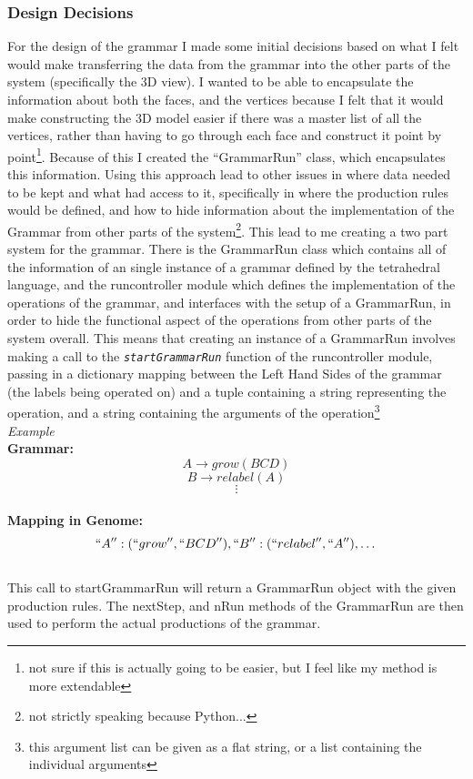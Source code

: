 \documentclass[letterpaper,oneside,titlepage]{article}
\begin{document}
\subsubsection{Design Decisions}
For the design of the grammar I made some initial decisions based on what I felt would make transferring the data from the grammar into the other parts of the system (specifically the 3D view).  I wanted to be able to encapsulate the information about both the faces, and the vertices because I felt that it would make constructing the 3D model easier if there was a master list of all the vertices, rather than having to go through each face and construct it point by point\footnote{not sure if this is actually going to be easier, but I feel like my method is more extendable}.  Because of this I created the ``GrammarRun'' class, which encapsulates this information.  Using this approach lead to other issues in where data needed to be kept and what had access to it, specifically in where the production rules would be defined, and how to hide information about the implementation of the Grammar from other parts of the system\footnote{not strictly speaking because Python...}.  This lead to me creating a two part system for the grammar.  There is the GrammarRun class which contains all of the information of an single instance of a grammar defined by the tetrahedral language, and the runcontroller module which defines the implementation of the operations of the grammar, and interfaces with the setup of a GrammarRun, in order to hide the functional aspect of the operations from other parts of the system overall.  This means that creating an instance of a GrammarRun involves making a call to the \emph{\texttt{startGrammarRun}} function of the runcontroller module, passing in a dictionary mapping between the Left Hand Sides of the grammar (the labels being operated on) and a tuple containing a string representing the operation, and a string containing the arguments of the operation\footnote{this argument list can be given as a flat string, or a list containing the individual arguments}
\\
\emph{Example}
\\
\textbf{Grammar:}
\\
\[A \to grow(BCD)\]
\[B \to relabel(A)\]
\[\vdots\]
\\
\textbf{Mapping in Genome:}
\\
\[ ``A'' : (``grow'',``BCD''), ``B'' : (``relabel'',``A''), \dots  \]
\\
This call to startGrammarRun will return a GrammarRun object with the given production rules.  The nextStep, and nRun methods of the GrammarRun are then used to perform the actual productions of the grammar.
\end{document}
